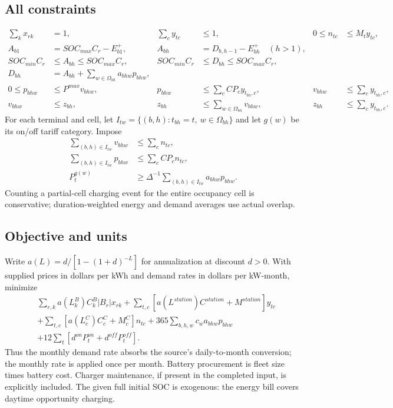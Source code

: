 \documentclass[11pt]{article}
\begin{document}
\subsection*{All constraints}
\begin{align}
\sum_kx_{rk}&=1,&
\sum_c y_{tc}&\le1,&
0\le n_{tc}&\le M_t y_{tc},\\
A_{b1}&=SOC_{max}C_r-E_{b1}^{+},&
A_{bh}&=D_{b,h-1}-E_{bh}^{+}\quad(h>1),\\
SOC_{min}C_r&\le A_{bh}\le SOC_{max}C_r,&
SOC_{min}C_r&\le D_{bh}\le SOC_{max}C_r,\\
D_{bh}&=A_{bh}+\sum_{w\in\Omega_{bh}}a_{bhw}p_{bhw},\\
0\le p_{bhw}&\le P^{max}v_{bhw},&
p_{bhw}&\le\sum_cCP_c y_{t_{bh},c},&
v_{bhw}&\le\sum_cy_{t_{bh},c},\\
v_{bhw}&\le z_{bh},&
z_{bh}&\le\sum_{w\in\Omega_{bh}}v_{bhw},&
z_{bh}&\le\sum_c y_{t_{bh},c}.
\end{align}
For each terminal and cell, let
$I_{tw}=\{(b,h):t_{bh}=t,\ w\in\Omega_{bh}\}$ and let $g(w)$ be its on/off
tariff category. Impose
\begin{align}
\sum_{(b,h)\in I_{tw}}v_{bhw}&\le\sum_c n_{tc},\\
\sum_{(b,h)\in I_{tw}}p_{bhw}&\le\sum_c CP_cn_{tc},\\
P_t^{g(w)}&\ge\Delta^{-1}\sum_{(b,h)\in I_{tw}}a_{bhw}p_{bhw}.
\end{align}
Counting a partial-cell charging event for the entire occupancy cell is
conservative; duration-weighted energy and demand averages use actual overlap.

\subsection*{Objective and units}
Write $a(L)=d/[1-(1+d)^{-L}]$ for annualization at discount $d>0$.
With supplied prices in dollars per kWh and demand rates in dollars per
kW-month, minimize
\begin{align}
&\sum_{r,k}a(L_k^B)C_k^B|B_r|x_{rk}
+\sum_{t,c}[a(L^{station})C^{station}+M^{station}]y_{tc}\\
&+\sum_{t,c}[a(L_c^C)C_c^C+M_c^C]n_{tc}
+365\sum_{b,h,w}c_w a_{bhw}p_{bhw}\\
&+12\sum_t[d^{on}P_t^{on}+d^{off}P_t^{off}].
\end{align}
Thus the monthly demand rate absorbs the source's daily-to-month conversion;
the monthly rate is applied once per month. Battery procurement
is fleet size times battery cost. Charger maintenance, if present in the completed
input, is explicitly included. The given full initial SOC is exogenous:
the energy bill covers daytime opportunity charging.
\end{document}
